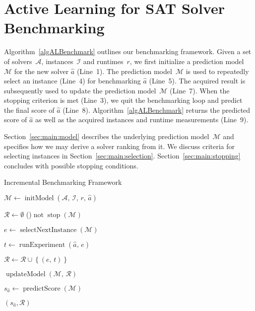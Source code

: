 \documentclass[runningheads]{llncs}
\begin{document}
\section{Active Learning for SAT Solver Benchmarking}
\label{sec:main}

Algorithm~\ref{algALBenchmark} outlines our benchmarking framework. 
Given a set of solvers~$\mathcal{A}$, instances~$\mathcal{I}$ and runtimes~$r$, we first initialize a prediction model~$\mathcal{M}$ for the new solver $\hat a$ (Line~1).
The prediction model~$\mathcal{M}$ is used to repeatedly select an instance (Line~4) for benchmarking $\hat a$ (Line~5). 
The acquired result is subsequently used to update the prediction model~$\mathcal{M}$ (Line~7). 
When the stopping criterion is met (Line~3), we quit the benchmarking loop and predict the final score of $\hat a$ (Line~8). 
Algorithm~\ref{algALBenchmark} returns the predicted score of $\hat a$ as well as the acquired instances and runtime measurements (Line~9). 

Section~\ref{sec:main:model} describes the underlying prediction model~$\mathcal{M}$ and specifies how we may derive a solver ranking from it.
We discuss criteria for selecting instances in Section~\ref{sec:main:selection}.
Section~\ref{sec:main:stopping} concludes with possible stopping conditions.

\begin{algorithm}[t]
  \caption{Incremental Benchmarking Framework}
  \label{algALBenchmark}


  \BlankLine

  $\mathcal{M} \leftarrow \operatorname{initModel}\left(\mathcal{A},\, \mathcal{I},\, r,\, \hat{a}\right)$ 
  
  \BlankLine
  $\mathcal{R} \leftarrow \emptyset$ \;
  \While(){$\operatorname{not} \operatorname{stop}\left(\mathcal{M}\right)$}{
    $e \leftarrow \operatorname{selectNextInstance}\left(\mathcal{M}\right)$ 

    $t \leftarrow \operatorname{runExperiment}\left(\hat{a},\,  e\right)$  

    $\mathcal{R} \leftarrow \mathcal{R} \cup \left\lbrace (e,\, t) \right\rbrace$

    \BlankLine
    $\operatorname{updateModel}\left(\mathcal{M},\, \mathcal{R}\right)$ 
  }
  $s_{\hat a} \leftarrow \operatorname{predictScore}(\mathcal{M})$ 
  
  \BlankLine
  \Return $(s_{\hat a}, \mathcal{R})$
\end{algorithm}
\end{document}

